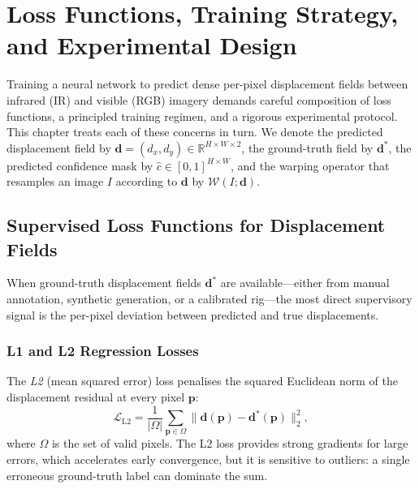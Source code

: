 
\chapter{Loss Functions, Training Strategy, and Experimental Design}
\label{ch:loss_training}

Training a neural network to predict dense per-pixel displacement fields
between infrared (IR) and visible (RGB) imagery demands careful composition
of loss functions, a principled training regimen, and a rigorous experimental
protocol.  This chapter treats each of these concerns in turn.  We denote the
predicted displacement field by $\mathbf{d} = (d_x, d_y) \in
\mathbb{R}^{H \times W \times 2}$, the ground-truth field by
$\mathbf{d}^{*}$, the predicted confidence mask by
$\hat{c} \in [0,1]^{H \times W}$, and the warping operator that resamples an
image $I$ according to $\mathbf{d}$ by $\mathcal{W}(I;\mathbf{d})$.


\section{Supervised Loss Functions for Displacement Fields}
\label{sec:supervised_loss}

When ground-truth displacement fields $\mathbf{d}^{*}$ are available---either
from manual annotation, synthetic generation, or a calibrated rig---the most
direct supervisory signal is the per-pixel deviation between predicted and
true displacements.

\subsection{L1 and L2 Regression Losses}
\label{ssec:l1l2}

The \emph{L2} (mean squared error) loss penalises the squared Euclidean norm
of the displacement residual at every pixel $\mathbf{p}$:
%
\begin{equation}
  \mathcal{L}_{\text{L2}}
  = \frac{1}{|\Omega|}\sum_{\mathbf{p}\in\Omega}
    \lVert \mathbf{d}(\mathbf{p}) - \mathbf{d}^{*}(\mathbf{p}) \rVert_{2}^{2},
  \label{eq:l2}
\end{equation}
%
where $\Omega$ is the set of valid pixels.  The L2 loss provides strong
gradients for large errors, which accelerates early convergence, but it is
sensitive to outliers: a single erroneous ground-truth label can dominate the
sum.

